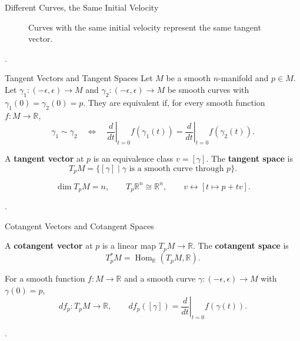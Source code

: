\documentclass[aspectratio=169,11pt]{beamer}
\newcommand{\sources}[1]{\par\vfill{\scriptsize\color{black!75}#1\par}}
\begin{document}
\begin{frame}{Different Curves, the Same Initial Velocity}
  \begin{figure}
    \centering
    \resizebox{!}{0.62\textheight}{}
    \caption{Curves with the same initial velocity represent the same tangent vector.}
    \label{fig:slides-curve-velocity}
  \end{figure}
  \sources{\cite[p.~72]{lee2013smooth}.}
\end{frame}

\begin{frame}{Tangent Vectors and Tangent Spaces}
  Let $M$ be a smooth $n$-manifold and $p\in M$.
  Let $\gamma_1\colon(-\epsilon,\epsilon)\to M$ and
  $\gamma_2\colon(-\epsilon,\epsilon)\to M$ be smooth curves with
  $\gamma_1(0)=\gamma_2(0)=p$.
  They are equivalent if, for every smooth function
  $f\colon M\to\mathbb{R}$,
  \begin{equation}
    \gamma_1\sim\gamma_2
    \quad\Longleftrightarrow\quad
    \left.\frac{d}{dt}\right|_{t=0}f(\gamma_1(t))
    =\left.\frac{d}{dt}\right|_{t=0}f(\gamma_2(t)).
  \end{equation}
  \begin{definition}
    A \textbf{tangent vector} at $p$ is an equivalence class $v=[\gamma]$.
    The \textbf{tangent space} is
    \begin{equation}
      T_pM=\{[\gamma]\mid\gamma\text{ is a smooth curve through }p\}.
    \end{equation}
  \end{definition}
  \begin{equation}
    \dim T_pM=n,
    \qquad T_p\mathbb{R}^n\cong\mathbb{R}^n,
    \qquad v\longleftrightarrow[t\mapsto p+tv].
  \end{equation}
  \sources{\cite[p.~72; Problem~3-8, p.~76; Proposition~3.10, p.~57]{lee2013smooth}.}
\end{frame}

\begin{frame}{Cotangent Vectors and Cotangent Spaces}
  \begin{definition}
    A \textbf{cotangent vector} at $p$ is a linear map $T_pM\to\mathbb{R}$.
    The \textbf{cotangent space} is
    \begin{equation}
      T_p^*M=\operatorname{Hom}_{\mathbb{R}}(T_pM,\mathbb{R}).
    \end{equation}
  \end{definition}
  \begin{example}
    For a smooth function $f\colon M\to\mathbb{R}$ and a smooth curve
    $\gamma\colon(-\epsilon,\epsilon)\to M$ with $\gamma(0)=p$,
    \begin{equation}
      df_p\colon T_pM\to\mathbb{R},
      \qquad
      df_p([\gamma])=\left.\frac{d}{dt}\right|_{t=0}f(\gamma(t)).
    \end{equation}
  \end{example}
  \sources{\cite[Chapter~11]{lee2013smooth}.}
\end{frame}
\end{document}
